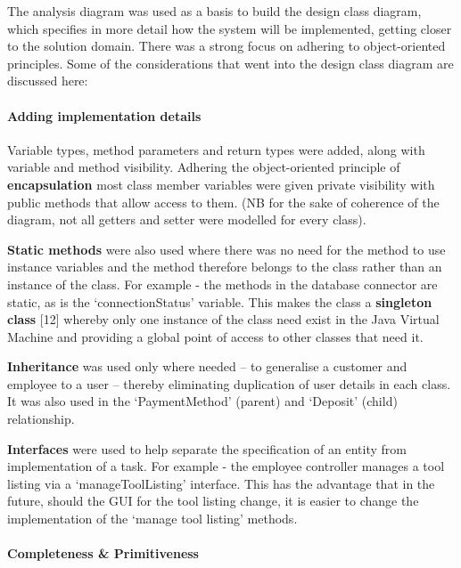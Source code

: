 \documentclass[fontsize=11pt]{extarticle}
\numberwithin{figure}{section} %
\numberwithin{table}{section}%
\let\oldparagraph\paragraph
\renewcommand{\paragraph}[1]{\oldparagraph{#1}\mbox{}}
\begin{document}
The analysis diagram was used as a basis to build the design class
diagram, which specifies in more detail how the system will be
implemented, getting closer to the solution domain. There was a strong
focus on adhering to object-oriented principles. Some of the
considerations that went into the design class diagram are discussed
here:

\hypertarget{adding-implementation-details}{%
\paragraph{Adding implementation
details}\label{adding-implementation-details}}

Variable types, method parameters and return types were added, along
with variable and method visibility. Adhering the object-oriented
principle of \textbf{encapsulation} most class member variables were
given private visibility with public methods that allow access to them.
(NB for the sake of coherence of the diagram, not all getters and setter
were modelled for every class).

\textbf{Static methods} were also used where there was no need for the
method to use instance variables and the method therefore belongs to the
class rather than an instance of the class. For example - the methods in
the database connector are static, as is the `connectionStatus'
variable. This makes the class a \textbf{singleton class} {[}12{]}
whereby only one instance of the class need exist in the Java Virtual
Machine and providing a global point of access to other classes that
need it.

\textbf{Inheritance} was used only where needed -- to generalise a
customer and employee to a user -- thereby eliminating duplication of
user details in each class. It was also used in the `PaymentMethod'
(parent) and `Deposit' (child) relationship.

\textbf{Interfaces} were used to help separate the specification of an
entity from implementation of a task. For example - the employee
controller manages a tool listing via a `manageToolListing' interface.
This has the advantage that in the future, should the GUI for the tool
listing change, it is easier to change the implementation of the `manage
tool listing' methods.

\hypertarget{completeness-primitiveness}{%
\paragraph{Completeness \&
Primitiveness}\label{completeness-primitiveness}}
\end{document}
